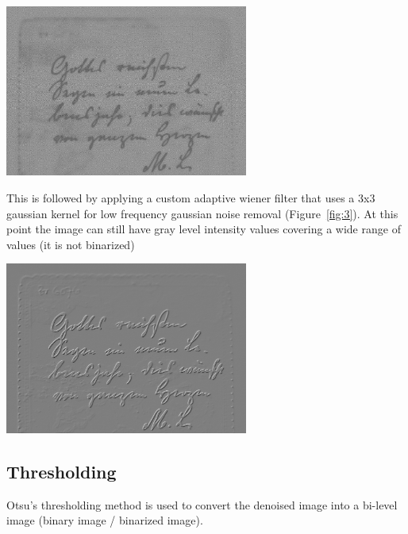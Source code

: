\documentclass[a4paper]{article}
\begin{document}
\begin{multicols}{2}
    \noindent
    \begin{minipage}{\linewidth}
        \centering
        \includegraphics[width=8cm]{wavelet difference.png}
        \label{fig:2}
    \end{minipage}

    This is followed by applying a custom adaptive wiener filter that uses a 3x3 gaussian kernel for low frequency gaussian noise removal (Figure~\ref{fig:3}). At this point the image can still have gray level intensity values covering a wide range of values (it is not binarized)

    \noindent
    \begin{minipage}{\linewidth}
        \centering
        \includegraphics[width=8cm]{wiener difference.png}
        \label{fig:3}
    \end{minipage}

    \subsection{Thresholding}
    Otsu's thresholding method is used to convert the denoised image into a bi-level image (binary image / binarized image).


\end{multicols}
\end{document}
